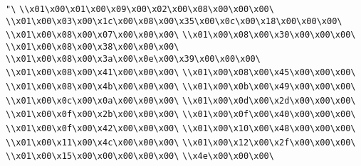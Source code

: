 \verb|"\|\newline
\verb|\\x01\x00\x01\x00\x09\x00\x02\x00\x08\x00\x00\x00\|\newline
\verb|\\x01\x00\x03\x00\x1c\x00\x08\x00\x35\x00\x0c\x00\x18\x00\x00\x00\|\newline
\verb|\\x01\x00\x08\x00\x07\x00\x00\x00\|\newline
\verb|\\x01\x00\x08\x00\x30\x00\x00\x00\|\newline
\verb|\\x01\x00\x08\x00\x38\x00\x00\x00\|\newline
\verb|\\x01\x00\x08\x00\x3a\x00\x0e\x00\x39\x00\x00\x00\|\newline
\verb|\\x01\x00\x08\x00\x41\x00\x00\x00\|\newline
\verb|\\x01\x00\x08\x00\x45\x00\x00\x00\|\newline
\verb|\\x01\x00\x08\x00\x4b\x00\x00\x00\|\newline
\verb|\\x01\x00\x0b\x00\x49\x00\x00\x00\|\newline
\verb|\\x01\x00\x0c\x00\x0a\x00\x00\x00\|\newline
\verb|\\x01\x00\x0d\x00\x2d\x00\x00\x00\|\newline
\verb|\\x01\x00\x0f\x00\x2b\x00\x00\x00\|\newline
\verb|\\x01\x00\x0f\x00\x40\x00\x00\x00\|\newline
\verb|\\x01\x00\x0f\x00\x42\x00\x00\x00\|\newline
\verb|\\x01\x00\x10\x00\x48\x00\x00\x00\|\newline
\verb|\\x01\x00\x11\x00\x4c\x00\x00\x00\|\newline
\verb|\\x01\x00\x12\x00\x2f\x00\x00\x00\|\newline
\verb|\\x01\x00\x15\x00\x00\x00\x00\x00\|\newline
\verb|\\x4e\x00\x00\x00\|\newline
